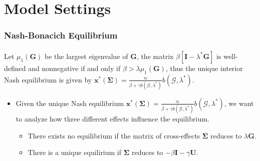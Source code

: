 \documentclass{beamer}
\begin{document}
\section{Model Settings} 
\begin{frame}[label=current]
    \frametitle{Nash-Bonacich Equilibrium}
    \framesubtitle{}
    \begin{theorem}
        Let $\mu_1(\bm{G})$ be the largest eigenvalue of $\bm{G}$,
        the matrix $\beta[\bm{I}-\lambda^*\bm{G}]$ is well-defined and nonnegative
        if and only if $\beta>\lambda\mu_1(\bm{G})$, thus the unique interior Nash equilibrium
        is given by $\bm{x}^*(\bm{\Sigma})=\frac{\alpha}{\beta+\gamma b(\mathscr{G},\lambda^*)}
        b(\mathscr{G},\lambda^*)$.
    \end{theorem}
    \begin{itemize}
                   \setlength\itemsep{-0.5em}
        \item Given the unique Nash equilibrium 
            $\bm{x}^*(\bm{\Sigma})=\frac{\alpha}{\beta+\gamma b(\mathscr{G},\lambda^*)}
            b(\mathscr{G},\lambda^*)$, we want to analyze how three different effects influence
           the equilibrium.
           \begin{itemize}
                   \setlength\itemsep{-0.5em}
               \item There exists no equilibrium if the matrix of cross-effects $\bm{\Sigma}$ 
                   reduces to $\lambda\bm{G}$.
               \item There is a unique equilirium if $\bm{\Sigma}$ reduces to $-\beta\bm{I}-\gamma\bm{U}$.
           \end{itemize}
    \end{itemize}
\end{frame}
\end{document}
